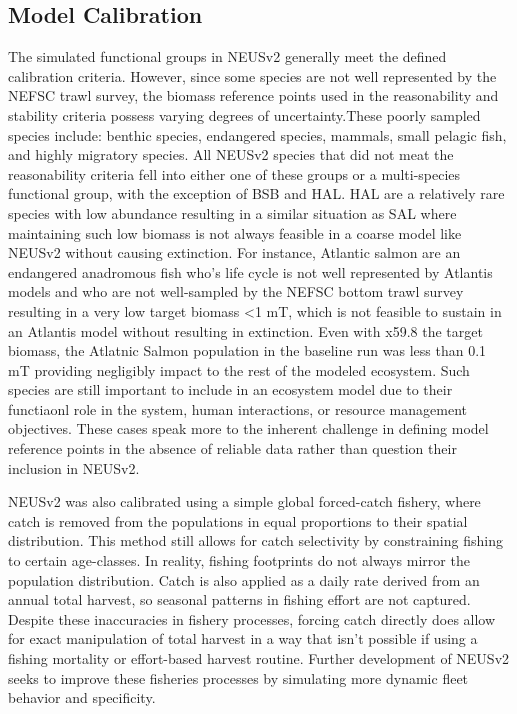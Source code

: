 \documentclass[
]{article}
\begin{document}
\subsection{Model Calibration}\label{model-calibration}

The simulated functional groups in NEUSv2 generally meet the defined calibration criteria. However, since some species are not well represented by the NEFSC trawl survey, the biomass reference points used in the reasonability and stability criteria possess varying degrees of uncertainty.These poorly sampled species include: benthic species, endangered species, mammals, small pelagic fish, and highly migratory species. All NEUSv2 species that did not meat the reasonability criteria fell into either one of these groups or a multi-species functional group, with the exception of BSB and HAL. HAL are a relatively rare species with low abundance resulting in a similar situation as SAL where maintaining such low biomass is not always feasible in a coarse model like NEUSv2 without causing extinction. For instance, Atlantic salmon are an endangered anadromous fish who's life cycle is not well represented by Atlantis models and who are not well-sampled by the NEFSC bottom trawl survey resulting in a very low target biomass \textless1 mT, which is not feasible to sustain in an Atlantis model without resulting in extinction. Even with x59.8 the target biomass, the Atlatnic Salmon population in the baseline run was less than 0.1 mT providing negligibly impact to the rest of the modeled ecosystem. Such species are still important to include in an ecosystem model due to their functiaonl role in the system, human interactions, or resource management objectives. These cases speak more to the inherent challenge in defining model reference points in the absence of reliable data rather than question their inclusion in NEUSv2.

NEUSv2 was also calibrated using a simple global forced-catch fishery, where catch is removed from the populations in equal proportions to their spatial distribution. This method still allows for catch selectivity by constraining fishing to certain age-classes. In reality, fishing footprints do not always mirror the population distribution. Catch is also applied as a daily rate derived from an annual total harvest, so seasonal patterns in fishing effort are not captured. Despite these inaccuracies in fishery processes, forcing catch directly does allow for exact manipulation of total harvest in a way that isn't possible if using a fishing mortality or effort-based harvest routine. Further development of NEUSv2 seeks to improve these fisheries processes by simulating more dynamic fleet behavior and specificity.
\end{document}
